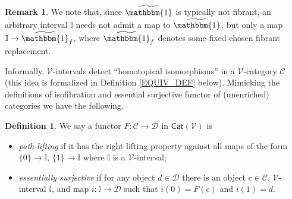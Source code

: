 \documentclass[a4paper,10pt
,draft
]{article}%
\numberwithin{equation}{section}
\numberwithin{figure}{section}
\theoremstyle{definition} %
\newtheorem{definition}[equation]{Definition}%
\newtheorem{remark}[equation]{Remark}%
\newcommand{\Cat}{\mathsf{Cat}}
\newcommand{\V}{\ensuremath{\mathcal V}}
\newcommand{\I}{\mathbb I}
\newcommand{\J}{\mathbb J}
\newcommand{\1}{\ensuremath{\mathbbm 1}}%
\begin{document}
\begin{remark}
	We note that, since $\widetilde{\mathbbm{1}}$ is typically not fibrant,
	an arbitrary interval $\mathbb{I}$
	needs not admit a map to $\widetilde{\mathbbm{1}}$,
	but only a map $\mathbb{I} \to \widetilde{\mathbbm{1}}_f$,
	where $\widetilde{\mathbbm{1}}_f$ denotes some fixed chosen fibrant replacement.
\end{remark}



Informally, $\V$-intervals detect ``homotopical isomorphisms'' in a $\V$-category $\mathcal{C}$ 
(this idea is formalized in Definition \ref{EQUIV_DEF} below).
Mimicking the definitions of isofibration and essential surjective functor of (unenriched) categories we have the following.



\begin{definition}\label{PL_ES_DEFN}
We say a functor $F: \mathcal C \to \mathcal D$ in $\Cat(\V)$ is
\begin{itemize}
\item \textit{path-lifting}
	if it has the right lifting property against all maps of the form
	$\{0\} \to \I$, $\{1\} \to \I$
	where $\I$ is a $\V$-interval; 
\item \textit{essentially surjective} 
	if for any object $d \in \mathcal{D}$
	there is an object $c \in \mathcal{C}$,
	$\V$-interval $\mathbb{I}$,
	and map $i \colon \mathbb{I} \to \mathcal D$
	such that $i(0) = F(c)$ and $i(1)=d$.
      \end{itemize}
\end{definition}
\end{document}
